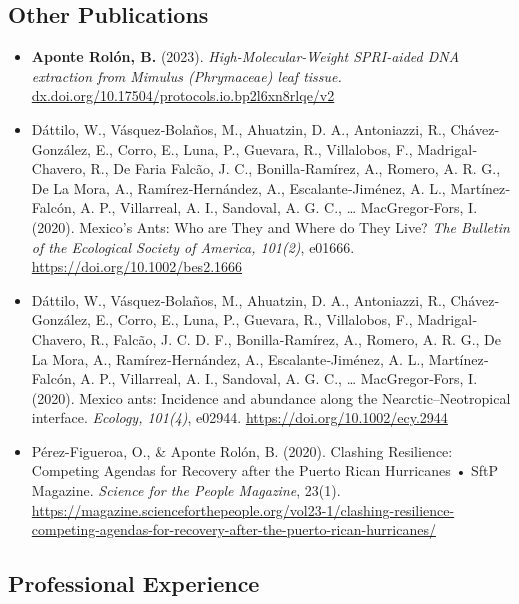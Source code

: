 \documentclass[
  letterpaper,
  DIV=11,
  numbers=noendperiod]{scrartcl}
\begin{document}
\subsection{\texorpdfstring{ Other
Publications}{ Other Publications}}\label{other-publications}

\begin{itemize}
\item
  \textbf{Aponte Rolón, B.} (2023). \emph{High-Molecular-Weight
  SPRI-aided DNA extraction from Mimulus (Phrymaceae) leaf tissue.}
  \url{dx.doi.org/10.17504/protocols.io.bp2l6xn8rlqe/v2}
\item
  Dáttilo, W., Vásquez‐Bolaños, M., Ahuatzin, D. A., Antoniazzi, R.,
  Chávez‐González, E., Corro, E., Luna, P., Guevara, R., Villalobos, F.,
  Madrigal‐Chavero, R., De Faria Falcão, J. C., Bonilla‐Ramírez, A.,
  Romero, A. R. G., De La Mora, A., Ramírez‐Hernández, A.,
  Escalante‐Jiménez, A. L., Martínez‐Falcón, A. P., Villarreal, A. I.,
  Sandoval, A. G. C., \ldots{} MacGregor‐Fors, I. (2020). Mexico's Ants:
  Who are They and Where do They Live? \emph{The Bulletin of the
  Ecological Society of America, 101(2)}, e01666.
  \url{https://doi.org/10.1002/bes2.1666}
\item
  Dáttilo, W., Vásquez‐Bolaños, M., Ahuatzin, D. A., Antoniazzi, R.,
  Chávez‐González, E., Corro, E., Luna, P., Guevara, R., Villalobos, F.,
  Madrigal‐Chavero, R., Falcão, J. C. D. F., Bonilla‐Ramírez, A.,
  Romero, A. R. G., De La Mora, A., Ramírez‐Hernández, A.,
  Escalante‐Jiménez, A. L., Martínez‐Falcón, A. P., Villarreal, A. I.,
  Sandoval, A. G. C., \ldots{} MacGregor‐Fors, I. (2020). Mexico ants:
  Incidence and abundance along the Nearctic--Neotropical interface.
  \emph{Ecology, 101(4)}, e02944. \url{https://doi.org/10.1002/ecy.2944}
\item
  Pérez-Figueroa, O., \& Aponte Rolón, B. (2020). Clashing Resilience:
  Competing Agendas for Recovery after the Puerto Rican Hurricanes •
  SftP Magazine. \emph{Science for the People Magazine}, 23(1).
  \url{https://magazine.scienceforthepeople.org/vol23-1/clashing-resilience-competing-agendas-for-recovery-after-the-puerto-rican-hurricanes/}
\end{itemize}

\subsection{\texorpdfstring{ Professional
Experience}{ Professional Experience}}\label{professional-experience}
\end{document}
